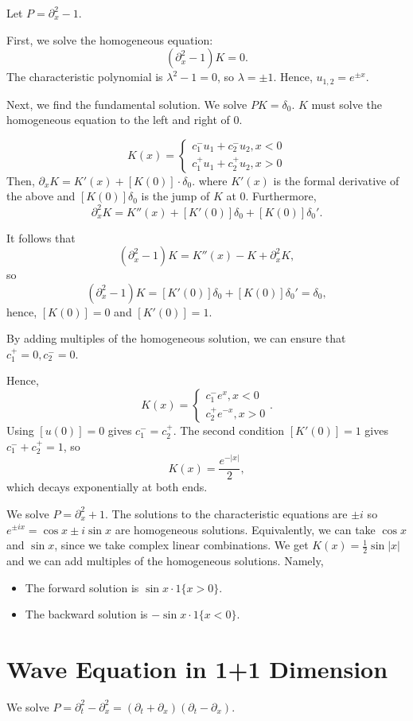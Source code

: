 \documentclass[11pt]{scrartcl}
\begin{document}
\begin{example} Let $P = \partial_x^2 - 1$.  

First, we solve the homogeneous equation: $$(\partial_x^2 - 1)K = 0.$$
The characteristic polynomial is $\lambda^2 - 1= 0$, so $\lambda = \pm 1$.  Hence, $u_{1,2} = e^{\pm x}.$

Next, we find the fundamental solution.  We solve $PK = \delta_0$.  $K$ must solve the homogeneous equation to the left and right of $0$.

$$K(x) = \begin{cases} c_1^{-}u_1 + c_2^{-}u_2, x < 0\\ c_1^{+}u_1 + c_2^{+}u_2, x > 0 \end{cases}$$
Then, $\partial_x K = K'(x) + [K(0)]\cdot \delta_0$. where $K'(x)$ is the formal derivative of the above and $[K(0)]\delta_0$ is the jump of $K$ at $0$.  Furthermore,
$$\partial_x^2 K = K''(x) + [K'(0)]\delta_0 + [K(0)]\delta_0'.$$

It follows that 
$$(\partial_x^2 - 1)K = K''(x) - K + \partial_x^2 K,$$
so $$(\partial_x^2 - 1)K = [K'(0)]\delta_0 + [K(0)]\delta_0' = \delta_0,$$
hence, $[K(0)] = 0$ and $[K'(0)] = 1$.

By adding multiples of the homogeneous solution, we can ensure that $c_1^+ = 0, c_2^- = 0$.  

Hence,
$$K(x) = \begin{cases} c_1^{-}e^{x},  x < 0 \\ c_2^{+}e^{-x}, x > 0\end{cases}.$$
Using $[u(0)] = 0$ gives $c_1^{-} = c_2^+$.  The second condition $[K'(0)] = 1$ gives $c_1^{-} + c_2^+ = 1$, so $$K(x) = \frac{e^{-|x|}}{2},$$
which decays exponentially at both ends.
\end{example}
\begin{example} We solve $P = \partial_x^2 + 1$.  The solutions to the characteristic equations are $\pm i$ so $ e^{\pm ix} = \cos x \pm i \sin x$ are homogeneous solutions.  Equivalently, we can take $\cos x$ and $\sin x$, since we take complex linear combinations.  We get $K(x) = \frac{1}{2} \sin |x|$ and we can add multiples of the homogeneous solutions.  Namely,
\begin{itemize}
\item The forward solution is $\sin x \cdot 1\{x > 0\}$.
\item The backward solution is $-\sin x \cdot 1\{x < 0\}.$
\end{itemize}
\end{example}
\section{Wave Equation in 1+1 Dimension} We solve $P = \partial_t^2 - \partial_x^2 = (\partial_t + \partial_x) (\partial_t - \partial_x).$
\end{document}
